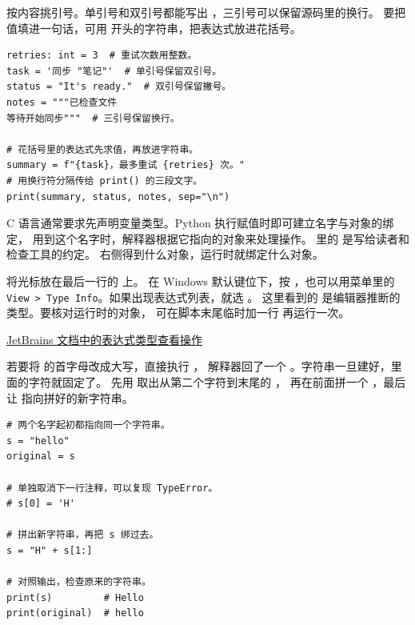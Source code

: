 按内容挑引号。单引号和双引号都能写出 ，三引号可以保留源码里的换行。
要把值填进一句话，可用  开头的字符串，把表达式放进花括号。


\begin{lstlisting}[title={\ttfamily variables.py},aboveskip=6pt,belowskip=6pt]
retries: int = 3  # 重试次数用整数。
task = '同步 "笔记"'  # 单引号保留双引号。
status = "It's ready."  # 双引号保留撇号。
notes = """已检查文件
等待开始同步"""  # 三引号保留换行。

# 花括号里的表达式先求值，再放进字符串。
summary = f"{task}，最多重试 {retries} 次。"
# 用换行符分隔传给 print() 的三段文字。
print(summary, status, notes, sep="\n")
\end{lstlisting}


\begin{myunderstanding}
C 语言通常要求先声明变量类型。Python 执行赋值时即可建立名字与对象的绑定，
用到这个名字时，解释器根据它指向的对象来处理操作。
 里的  是写给读者和检查工具的约定。
右侧得到什么对象，运行时就绑定什么对象。
\end{myunderstanding}

\begin{pycharmpractice}
将光标放在最后一行的  上。
在 Windows 默认键位下，按 ，也可以用菜单里的
\texttt{View > Type Info}。如果出现表达式列表，就选 。
这里看到的  是编辑器推断的类型。要核对运行时的对象，
可在脚本末尾临时加一行  再运行一次。

\href{https://www.jetbrains.com/help/pycharm/python-code-insight.html\#show-expression-type}
  {JetBrains 文档中的表达式类型查看操作}
\end{pycharmpractice}

\begin{pitfall}
若要将  的首字母改成大写，直接执行 ，
解释器回了一个 。字符串一旦建好，里面的字符就固定了。
先用  取出从第二个字符到末尾的 ，
再在前面拼一个 ，最后让  指向拼好的新字符串。
\end{pitfall}


\begin{lstlisting}[title={\code{fix_greeting.py}}]
# 两个名字起初都指向同一个字符串。
s = "hello"
original = s

# 单独取消下一行注释，可以复现 TypeError。
# s[0] = 'H'

# 拼出新字符串，再把 s 绑过去。
s = "H" + s[1:]

# 对照输出，检查原来的字符串。
print(s)         # Hello
print(original)  # hello
\end{lstlisting}


